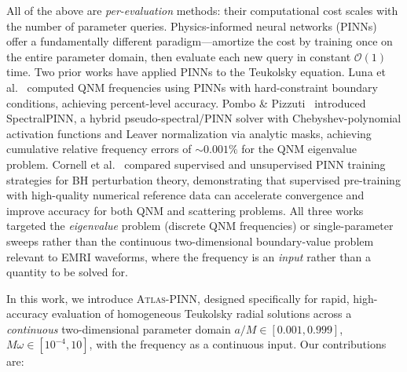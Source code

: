 \documentclass[aps,prd,twocolumn,superscriptaddress,nofootinbib]{revtex4-2}
\begin{document}
All of the above are \emph{per-evaluation} methods: their computational cost
scales with the number of parameter queries.  Physics-informed neural networks
(PINNs)~\cite{Raissi:2019pinn} offer a fundamentally different paradigm---amortize
the cost by training once on the entire parameter domain, then evaluate each new
query in constant $\mathcal{O}(1)$ time.  Two prior works have applied PINNs to
the Teukolsky equation.  Luna et al.~\cite{Luna:2022pinn} computed QNM
frequencies using PINNs with hard-constraint boundary conditions, achieving
percent-level accuracy.  Pombo \& Pizzuti~\cite{Pombo:2025tbyd} introduced
SpectralPINN, a hybrid pseudo-spectral/PINN solver with Chebyshev-polynomial
activation functions and Leaver normalization via analytic masks, achieving
cumulative relative frequency errors of $\sim 0.001\%$ for the QNM eigenvalue
problem.  Cornell et al.~\cite{Cornell:2024supervised} compared supervised and
unsupervised PINN training strategies for BH perturbation theory, demonstrating
that supervised pre-training with high-quality numerical reference data can
accelerate convergence and improve accuracy for both QNM and scattering
problems.  All three works targeted the \emph{eigenvalue} problem (discrete QNM
frequencies) or single-parameter sweeps rather than the continuous
two-dimensional boundary-value problem relevant to EMRI waveforms, where the
frequency is an \emph{input} rather than a quantity to be solved for.

In this work, we introduce \textsc{Atlas-PINN}, designed specifically for rapid,
high-accuracy evaluation of homogeneous Teukolsky radial solutions across a
\emph{continuous} two-dimensional parameter domain $a/M \in [0.001, 0.999]$,
$M\omega \in [10^{-4}, 10]$, with the frequency as a continuous input.  Our
contributions are:
\end{document}
